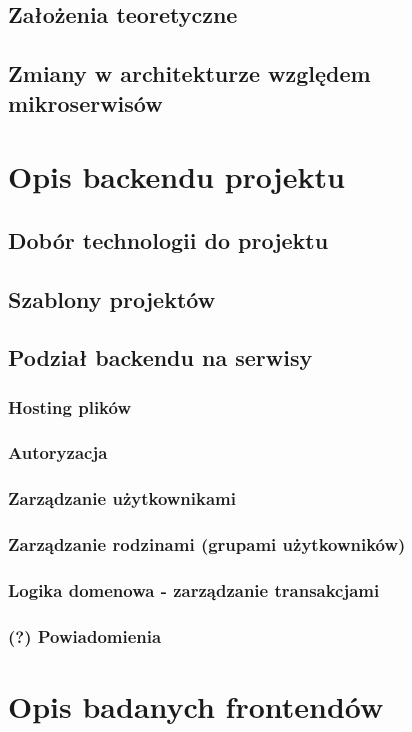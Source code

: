 \documentclass{SGGW-thesis}
\begin{document}
  \section{Założenia teoretyczne}
  \section{Zmiany w architekturze względem mikroserwisów}

\chapter{Opis backendu projektu}
  \section{Dobór technologii do projektu}
  \section{Szablony projektów}
  \section{Podział backendu na serwisy}
    \subsection{Hosting plików}
    \subsection{Autoryzacja}
    \subsection{Zarządzanie użytkownikami}
    \subsection{Zarządzanie rodzinami (grupami użytkowników)}
    \subsection{Logika domenowa - zarządzanie transakcjami}
    \subsection{(?) Powiadomienia}

\chapter{Opis badanych frontendów}
\end{document}
